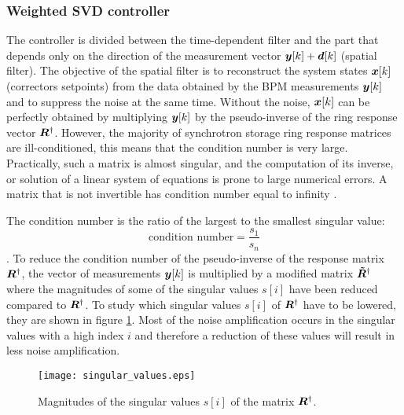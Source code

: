 \subsubsection{Weighted SVD controller}

The controller is divided between the time-dependent filter and the part that depends only on the direction of the measurement vector $\bm{y}[k] + \bm{d}[k]$ (spatial filter). The objective of the spatial filter is to reconstruct the system states $\bm{x}[k]$ (correctors setpoints) from the data obtained by the BPM measurements $\bm{y}[k]$ and to suppress the noise at the same time. Without the noise, $\bm{x}[k]$ can be perfectly obtained by multiplying $\bm{y}[k]$ by the pseudo-inverse of the ring response vector $\bm{R}^{\dagger}$. However, the majority of synchrotron storage ring response matrices are ill-conditioned, this means that the condition number is very large. Practically, such a matrix is almost singular, and the computation of its inverse, or solution of a linear system of equations is prone to large numerical errors. A matrix that is not invertible has condition number equal to infinity \cite{leon2006linear}. 

The condition number is the ratio of the largest to the smallest singular value:
\begin{equation} \label{e:condition_number}
    \textrm{condition number} = \frac{s_1}{s_n} 
\end{equation}
\cite{pillow2018Statistical}.
To reduce the condition number of the pseudo-inverse of the response matrix $\bm{R}^{\dagger}$, the vector of measurements $\bm{y}[k]$ is multiplied by a modified matrix $\bm{\tilde{R}}^{\dagger}$ where the magnitudes of some of the singular values $s[i]$ have been reduced compared to $\bm{R}^{\dagger}$. To study which singular values $s[i]$ of $\bm{R}^{\dagger}$ have to be lowered, they are shown in figure \ref{fig:singular_values}. Most of the noise amplification occurs in the singular values with a high index $i$ and therefore a reduction of these values will result in less noise amplification.

\begin{figure}
    \begin{center}
        \texttt{[image: singular\_values.eps]}
    \end{center}
    \caption{Magnitudes of the singular values $s[i]$ of the matrix $\bm{R}^{\dagger}$.}
    \label{fig:singular_values}
\end{figure}

